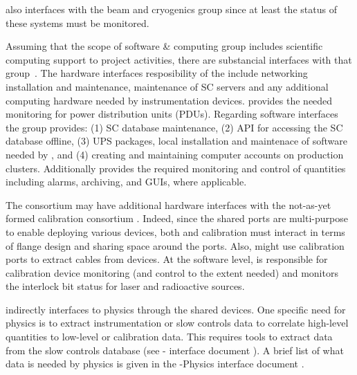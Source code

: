 
 also interfaces with the beam and cryogenics group since at least the status of these systems must be monitored.



Assuming that the scope of software \& computing  group includes scientific computing support to project activities, there are substancial interfaces with that group~\cite{bib:docdb7126}. 
The hardware interfaces resposibility of the  include networking installation and maintenance,
maintenance of SC servers  and any additional computing hardware needed by instrumentation devices.
 provides the needed monitoring for power distribution units (PDUs). Regarding software interfaces the  group  provides:
(1) SC database maintenance, (2) API for accessing the SC database offline,
(3) UPS packages, local installation and maintenace of software needed by , and (4)  creating and maintaining computer accounts on production clusters. 
Additionally   provides the required monitoring and control of  quantities including alarms, archiving, and GUIs, where applicable. 


The  consortium may have additional hardware interfaces with the not-as-yet formed calibration consortium \cite{bib:docdb7072}. Indeed, since %
the shared ports are multi-purpose to enable deploying various devices,
both  and calibration must interact in terms of flange design and sharing space around the ports. Also,  might use calibration ports to extract cables from  devices. 
At the software level,  is responsible for calibration device monitoring (and control to the extent needed) and 
monitors the interlock bit status for laser and radioactive sources. 


 indirectly interfaces to physics through the shared devices. One specific need for physics is to extract 
instrumentation or slow controls data to correlate high-level quantities to low-level or calibration data.
This requires tools to extract data from the slow controls database (see - interface document \cite{bib:docdb7126}).
A brief list of what  data is needed by physics is given in the -Physics interface document \cite{bib:docdb7099}. 

